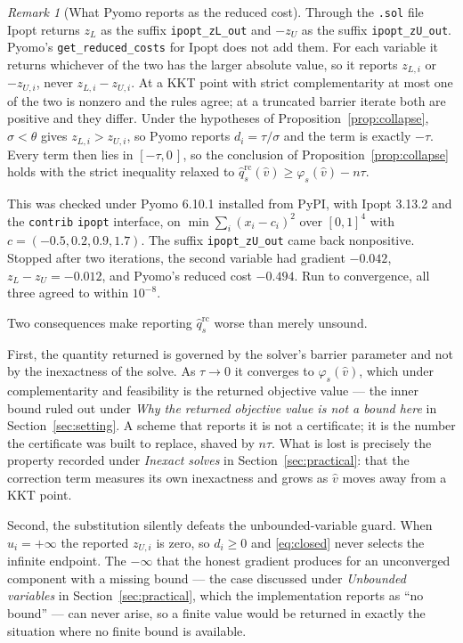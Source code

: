 \documentclass[11pt]{article}
\theoremstyle{plain}
\theoremstyle{remark}
\newtheorem{remark}[lemma]{Remark}
\newcommand{\vhat}{\hat{v}}
\newcommand{\qhat}{\hat{q}}
\begin{document}
\begin{remark}[What Pyomo reports as the reduced cost]\label{rem:pyomorc}
Through the \texttt{.sol} file Ipopt returns $z_L$ as the suffix
\texttt{ipopt\_zL\_out} and $-z_U$ as the suffix \texttt{ipopt\_zU\_out}.
Pyomo's \texttt{get\_reduced\_costs} for Ipopt does not add them.  For
each variable it returns whichever of the two has the larger absolute value, so
it reports $z_{L,i}$ or $-z_{U,i}$, never $z_{L,i} - z_{U,i}$.  At a KKT point
with strict complementarity at most one of the two is nonzero and the rules
agree; at a truncated barrier iterate both are positive and they differ.  Under
the hypotheses of Proposition~\ref{prop:collapse}, $\sigma < \theta$ gives
$z_{L,i} > z_{U,i}$, so Pyomo reports $d_i = \tau/\sigma$ and the term is
exactly $-\tau$.  Every term then lies in $[-\tau, 0\,]$, so the conclusion of
Proposition~\ref{prop:collapse} holds with the strict inequality relaxed to
$\qhat_s^{\mathrm{rc}}(\vhat) \ge \varphi_s(\vhat) - n\tau$.

This was checked under Pyomo 6.10.1 installed from PyPI, with Ipopt 3.13.2 and
the \texttt{contrib} \texttt{ipopt} interface, on
$\min \sum_i (x_i - c_i)^2$ over $[0,1]^4$ with $c = (-0.5, 0.2, 0.9, 1.7)$.
The suffix \texttt{ipopt\_zU\_out} came back nonpositive.  Stopped after two
iterations, the second variable had gradient $-0.042$, $z_L - z_U = -0.012$,
and Pyomo's reduced cost $-0.494$.  Run to convergence, all three agreed to
within $10^{-8}$.
\end{remark}

Two consequences make reporting $\qhat_s^{\mathrm{rc}}$ worse than merely unsound.

First, the quantity returned is governed by the solver's barrier parameter and
not by the inexactness of the solve.  As $\tau \to 0$ it converges to
$\varphi_s(\vhat)$, which under complementarity and feasibility is the returned
objective value --- the inner bound ruled out under \emph{Why the returned
objective value is not a bound here} in Section~\ref{sec:setting}.  A
scheme that reports it is not a certificate; it is the number the certificate
was built to replace, shaved by $n\tau$.  What is lost is precisely the property
recorded under \emph{Inexact solves} in Section~\ref{sec:practical}: that
the correction term measures its own
inexactness and grows as $\vhat$ moves away from a KKT point.

Second, the substitution silently defeats the unbounded-variable guard.  When
$u_i = +\infty$ the reported $z_{U,i}$ is zero, so $d_i \ge 0$ and
\eqref{eq:closed} never selects the infinite endpoint.  The
$-\infty$ that the honest gradient produces for an unconverged component with a
missing bound --- the case discussed under \emph{Unbounded variables} in
Section~\ref{sec:practical}, which the implementation reports as ``no bound'' ---
can never arise, so a finite value would be returned in exactly the situation
where no finite bound is available.
\end{document}

